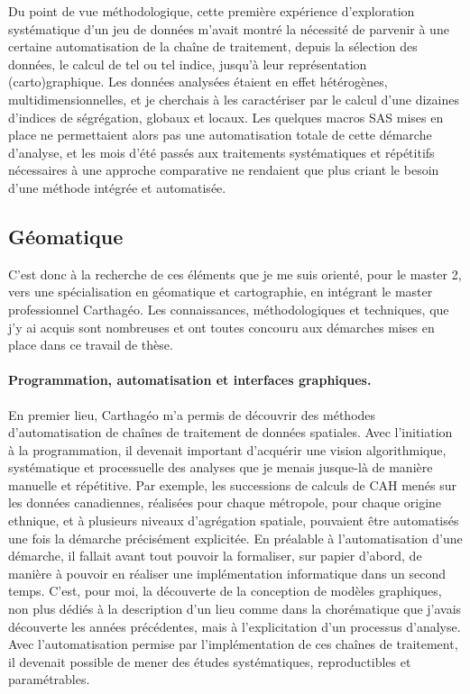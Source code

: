 Du point de vue méthodologique, cette première expérience d'exploration systématique d'un jeu de données m'avait montré la nécessité de parvenir à une certaine automatisation de la chaîne de traitement, depuis la sélection des données, le calcul de tel ou tel indice, jusqu'à leur représentation (carto)graphique.
Les données analysées étaient en effet hétérogènes, multidimensionnelles, et je cherchais à les caractériser par le calcul d'une dizaines d'indices de ségrégation, globaux et locaux.
Les quelques macros SAS mises en place ne permettaient alors pas une automatisation totale de cette démarche d'analyse, et les mois d'été passés aux traitements systématiques et répétitifs nécessaires à une approche comparative ne rendaient que plus criant le besoin d'une méthode intégrée et automatisée.

\subsection{Géomatique}

C'est donc à la recherche de ces éléments que je me suis orienté, pour le master 2, vers une spécialisation en géomatique et cartographie, en intégrant le master professionnel Carthagéo.
Les connaissances, méthodologiques et techniques, que j'y ai acquis sont nombreuses et ont toutes concouru aux démarches mises en place dans ce travail de thèse.

\paragraph{Programmation, automatisation et interfaces graphiques.}

En premier lieu, Carthagéo m'a permis de découvrir des méthodes d'automatisation de chaînes de traitement de données spatiales.
Avec l'initiation à la programmation, il devenait important d'acquérir une vision algorithmique, systématique et processuelle des analyses que je menais jusque-là de manière manuelle et répétitive.
Par exemple, les successions de calculs de CAH menés sur les données canadiennes, réalisées pour chaque métropole, pour chaque origine ethnique, et à plusieurs niveaux d'agrégation spatiale, pouvaient être automatisés une fois la démarche précisément explicitée.
En préalable à l'automatisation d'une démarche, il fallait avant tout pouvoir la formaliser, sur papier d'abord, de manière à pouvoir en réaliser une implémentation informatique dans un second temps.
C'est, pour moi, la découverte de la conception de modèles graphiques, non plus dédiés à la description d'un lieu comme dans la chorématique que j'avais découverte les années précédentes, mais à l'explicitation d'un processus d'analyse.
Avec l'automatisation permise par l'implémentation de ces chaînes de traitement, il devenait possible de mener des études systématiques, reproductibles et paramétrables.

